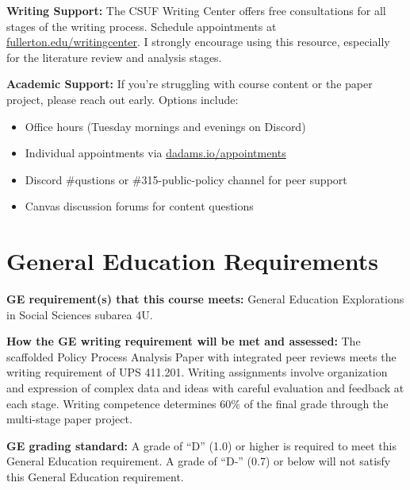 \documentclass[12pt]{article}     %
\begin{document}
\vspace{0.5em}
\noindent \textbf{Writing Support:} The CSUF Writing Center offers free consultations for all stages of the writing process. Schedule appointments at \href{http://www.fullerton.edu/writingcenter/}{fullerton.edu/writingcenter}. I strongly encourage using this resource, especially for the literature review and analysis stages.

\vspace{0.5em}
\noindent \textbf{Academic Support:} If you're struggling with course content or the paper project, please reach out early. Options include:
\begin{itemize}
\item Office hours (Tuesday mornings and evenings on Discord)
\item Individual appointments via \href{https://dadams.io/appointments}{dadams.io/appointments}
\item Discord \#qustions or \#315-public-policy channel for peer support
\item Canvas discussion forums for content questions
\end{itemize}

\section{General Education Requirements}
\noindent \textbf{GE requirement(s) that this course meets:} General Education Explorations in Social Sciences subarea 4U.

\vspace{0.5em}
\noindent \textbf{How the GE writing requirement will be met and assessed:}
The scaffolded Policy Process Analysis Paper with integrated peer reviews meets the writing requirement of UPS 411.201. Writing assignments involve organization and expression of complex data and ideas with careful evaluation and feedback at each stage. Writing competence determines 60\% of the final grade through the multi-stage paper project.

\vspace{0.5em}
\noindent \textbf{GE grading standard:}
A grade of ``D'' (1.0) or higher is required to meet this General Education requirement. A grade of ``D-'' (0.7) or below will not satisfy this General Education requirement.
\end{document}
